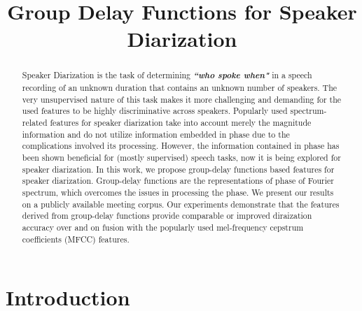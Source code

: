 \documentclass[conference]{IEEEtran}
\begin{document}
\title{Group Delay Functions for Speaker Diarization}

\author{
}

\maketitle


\begin{abstract}

Speaker Diarization is the task of determining {\bf\textit{``who spoke when"}} in a speech recording of an unknown duration that contains an unknown number of speakers. The very unsupervised nature of this task makes it more challenging and demanding for the used features to be highly discriminative across speakers. Popularly used spectrum-related features for speaker diarization take into account merely the magnitude information and do not utilize information embedded in phase due to the complications involved its processing. However, the information contained in phase has been shown beneficial for (mostly supervised) speech tasks, now it is being explored for speaker diarization. In this work, we propose group-delay functions based features for speaker diarization. Group-delay functions are the representations of phase of Fourier spectrum, which overcomes the issues in processing the phase. We present our results on a publicly available meeting corpus. Our experiments demonstrate that the features derived from group-delay functions provide comparable or improved diraization accuracy over and on fusion with the popularly used mel-frequency cepstrum coefficients (MFCC) features. \\

\end{abstract}
\IEEEpeerreviewmaketitle



\section{Introduction}
\label{intro}
\end{document}
